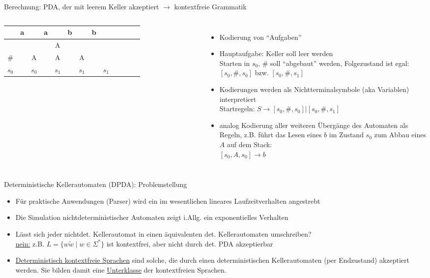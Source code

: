 \begin{frame}{Berechnung: PDA, der mit leerem Keller akzeptiert $\rightarrow$ kontextfreie Grammatik}
	\begin{columns}
		\begin{tabular}{ccccccccccccc}
			& a &  & a &  & b &  & b &  \\
			\hline
			&  &  &  & A &  &  &  &  \\
			\# &  & A &  & A &  & A &  &  \\
			\hline
			$s_0$ &  & $s_0$ &  & $s_1$ &  & $s_1$ &  & $s_1$ \\
		\end{tabular}
		\begin{itemize}
			\item Kodierung von "`Aufgaben"'
			\item Hauptaufgabe: Keller soll leer werden\\
			Starten in $s_0$, \# soll "`abgebaut"' werden, Folgezustand ist egal: $[s_0, \#, s_0]$ bzw. $[s_0, \#, s_1]$
			\item Kodierungen werden als Nichtterminalsymbole (aka Variablen) interpretiert\\
			Startregeln: $S \rightarrow [s_0, \#, s_0]|[s_0, \#, s_1]$
			\item analog Kodierung aller weiteren Übergänge des Automaten als Regeln, z.B. führt das Lesen eines $b$ im Zustand $s_0$ zum Abbau eines $A$ auf dem Stack:\\
			$[s_0, A, s_0] \rightarrow b$
		\end{itemize}
	\end{columns}
\end{frame}

\begin{frame}{Deterministische Kellerautomaten (DPDA): Problemstellung}
	\begin{itemize}
		\item Für praktische Anwendungen (Parser) wird ein im wesentlichen lineares Laufzeitverhalten angestrebt
		\item Die Simulation nichtdeterministischer Automaten zeigt i.Allg. ein exponentielles Verhalten
		\item Lässt sich jeder nichtdet. Kellerautomat in einen äquivalenten det. Kellerautomaten umschreiben?\\
		\underline{nein:} z.B. $L=\{w\tilde{w} \mid w\in \Sigma^*\}$ ist kontextfrei, aber nicht durch det. PDA akzeptierbar
		\item \underline{Deterministisch kontextfreie Sprachen} sind solche, die durch einen deterministischen Kellerautomaten (per Endzustand) akzeptiert werden. Sie bilden damit eine \underline{Unterklasse} der kontextfreien Sprachen.
	\end{itemize}
\end{frame}

